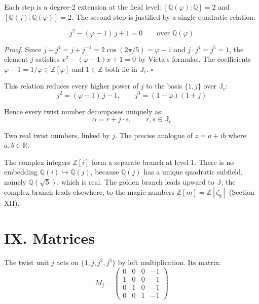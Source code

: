\documentclass[11pt, a4paper]{article}
\newcommand{\ph}{\varphi}
\newcommand{\TT}{\mathbb{J}}
\newcommand{\TTr}{\mathbb{J}_{\mathrm{r}}}
\begin{document}
\vspace{0.5em}

Each step is a degree-2 extension at the field level: $[\mathbb{Q}(\ph):\mathbb{Q}] = 2$ and $[\mathbb{Q}(j):\mathbb{Q}(\ph)] = 2$. The second step is justified by a single quadratic relation:

\begin{equation*}
\boxed{j^2 - (\ph - 1)\,j + 1 = 0 \qquad \text{over } \mathbb{Q}(\ph)}
\end{equation*}

\textit{Proof.} Since $j + j^4 = j + j^{-1} = 2\cos(2\pi/5) = \ph - 1$ and $j \cdot j^4 = j^5 = 1$, the element $j$ satisfies $x^2 - (\ph-1)x + 1 = 0$ by Vieta's formulas. The coefficients $\ph - 1 = 1/\ph \in \mathbb{Z}[\ph]$ and $1 \in \mathbb{Z}$ both lie in $\TTr$. \hfill$\square$

This relation reduces every higher power of $j$ to the basis $\{1, j\}$ over $\TTr$:
\begin{equation*}
j^2 = (\ph-1)\,j - 1, \qquad j^3 = (1-\ph)(1+j)
\end{equation*}

Hence every twist number decomposes uniquely as:
\begin{equation*}
\alpha = r + j \cdot s, \qquad r, s \in \TTr
\end{equation*}

Two real twist numbers, linked by $j$. The precise analogue of $z = a + ib$ where $a, b \in \mathbb{R}$.

\vspace{0.3em}

The complex integers $\mathbb{Z}[i]$ form a separate branch at level 1. There is no embedding $\mathbb{Q}(i)\hookrightarrow\mathbb{Q}(j)$, because $\mathbb{Q}(j)$ has a unique quadratic subfield, namely $\mathbb{Q}(\sqrt{5})$, which is real. The golden branch leads upward to $\TT$; the complex branch leads elsewhere, to the magic numbers $\mathbb{Z}[m] = \mathbb{Z}[\zeta_8]$ (Section XII).

\section*{IX. Matrices}

The twist unit $j$ acts on $\{1, j, j^2, j^3\}$ by left multiplication. Its matrix:
\begin{equation*}
M_j = \begin{pmatrix} 0 & 0 & 0 & -1 \\ 1 & 0 & 0 & -1 \\ 0 & 1 & 0 & -1 \\ 0 & 0 & 1 & -1 \end{pmatrix}
\end{equation*}
\end{document}

